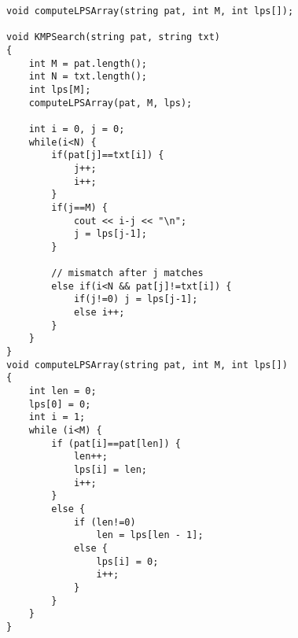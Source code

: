 \documentclass{article}
\begin{document}
\begin{multicols*}{2}
        \begin{lstlisting}
void computeLPSArray(string pat, int M, int lps[]);

void KMPSearch(string pat, string txt)
{
    int M = pat.length();
    int N = txt.length();
    int lps[M];
    computeLPSArray(pat, M, lps);
    
    int i = 0, j = 0;
    while(i<N) {
        if(pat[j]==txt[i]) {
            j++;
            i++;
        }
        if(j==M) {
            cout << i-j << "\n";
            j = lps[j-1];
        }
    
        // mismatch after j matches
        else if(i<N && pat[j]!=txt[i]) {
            if(j!=0) j = lps[j-1];
            else i++;
        }
    }
}
void computeLPSArray(string pat, int M, int lps[])
{
    int len = 0;
    lps[0] = 0;
    int i = 1;
    while (i<M) {
        if (pat[i]==pat[len]) {
            len++;
            lps[i] = len;
            i++;
        }
        else {
            if (len!=0)
                len = lps[len - 1];
            else {
                lps[i] = 0;
                i++;
            }
        }
    }
}\end{lstlisting}



    \end{multicols*}
\end{document}
